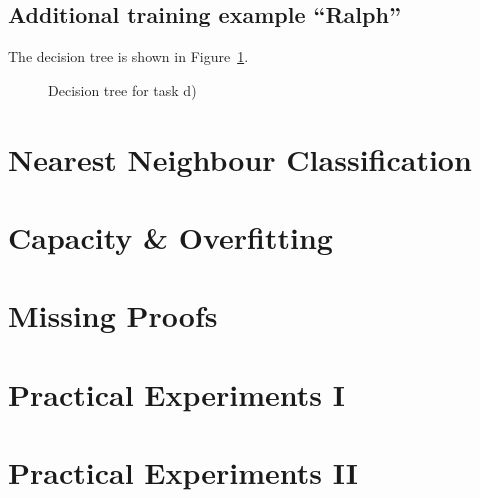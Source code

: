 \documentclass{scrartcl}
\begin{document}
\subsection{Additional training example ``Ralph''}

The decision tree is shown in Figure~\ref{fig:tree-ralph}.

\begin{figure}
\centering 
{}
\caption{Decision tree for task d)}
\label{fig:tree-ralph}
\end{figure}

\section{Nearest Neighbour Classification}
\section{Capacity \& Overfitting}
\section{Missing Proofs}
\section{Practical Experiments I}
\section{Practical Experiments II}

\begin{appendix}




  
\end{appendix}
  
\end{document}
